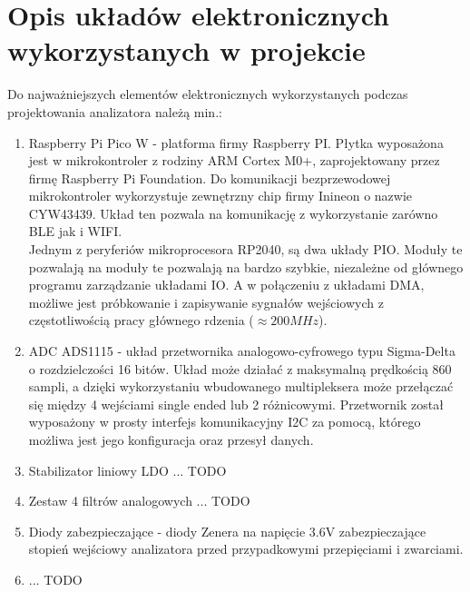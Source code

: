 \section{Opis układów elektronicznych wykorzystanych w projekcie}

Do najważniejszych elementów elektronicznych wykorzystanych 
podczas projektowania analizatora należą min.:
 
\begin{enumerate}
    \item Raspberry Pi Pico W - platforma firmy Raspberry PI.
        Płytka wyposażona jest w mikrokontroler z rodziny ARM Cortex M0+, zaprojektowany przez firmę Raspberry Pi Foundation.
        Do komunikacji bezprzewodowej mikrokontroler wykorzystuje zewnętrzny chip firmy Inineon o nazwie CYW43439.
        Układ ten pozwala na komunikację z wykorzystanie zarówno BLE jak i WIFI.\\
        Jednym z peryferiów mikroprocesora RP2040, są dwa układy PIO.
        Moduły te pozwalają na moduły te pozwalają na bardzo szybkie, niezależne od głównego programu zarządzanie układami IO.
        A w połączeniu z układami DMA, możliwe jest próbkowanie i zapisywanie sygnałów wejściowych z częstotliwością pracy głównego rdzenia ($\approx 200MHz$).
    \item ADC ADS1115 - 
        układ przetwornika analogowo-cyfrowego typu Sigma-Delta o rozdzielczości 16 bitów.
        Układ może działać z maksymalną prędkością 860 sampli,
        a dzięki wykorzystaniu wbudowanego multipleksera może przełączać się między 4 wejściami single ended lub 2 różnicowymi.
        Przetwornik został wyposażony w prosty interfejs komunikacyjny I2C za pomocą, którego możliwa jest jego konfiguracja oraz przesył danych.
    \item Stabilizator liniowy LDO ... TODO
    \item Zestaw 4 filtrów analogowych ... TODO  
    \item Diody zabezpieczające - diody Zenera na napięcie 3.6V zabezpieczające stopień wejściowy analizatora przed przypadkowymi przepięciami i zwarciami.
    \item ... TODO
\end{enumerate}
